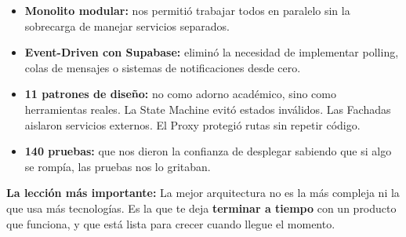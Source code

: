 \documentclass[12pt,a4paper]{article}
\begin{document}
\begin{itemize}[itemsep=3pt]
  \item \textbf{Monolito modular:} nos permitió trabajar todos en paralelo sin la sobrecarga de manejar servicios separados.
  \item \textbf{Event-Driven con Supabase:} eliminó la necesidad de implementar polling, colas de mensajes o sistemas de notificaciones desde cero.
  \item \textbf{11 patrones de diseño:} no como adorno académico, sino como herramientas reales. La State Machine evitó estados inválidos. Las Fachadas aislaron servicios externos. El Proxy protegió rutas sin repetir código.
  \item \textbf{140 pruebas:} que nos dieron la confianza de desplegar sabiendo que si algo se rompía, las pruebas nos lo gritaban.
\end{itemize}

\begin{tipbox}
\textbf{La lección más importante:} La mejor arquitectura no es la más compleja ni la que usa más tecnologías. Es la que te deja \textbf{terminar a tiempo} con un producto que funciona, y que está lista para crecer cuando llegue el momento.
\end{tipbox}
\end{document}
